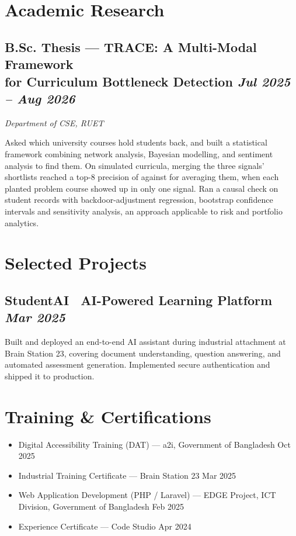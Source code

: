 \documentclass[10pt, a4paper]{article}
\newcommand{\datedsubsection}[2]{%
  \needspace{8\baselineskip}\subsection*{#1 \hfill \small\textit{#2}}%
}
\newcommand{\resitem}[1]{\item #1}
\begin{document}
\section{Academic Research}
\datedsubsection{B.Sc. Thesis --- TRACE: A Multi-Modal Framework \\ for Curriculum Bottleneck Detection}{Jul 2025 -- Aug 2026}
\textit{Department of CSE, RUET}

Asked which university courses hold students back, and built a statistical framework combining network analysis, Bayesian modelling, and sentiment analysis to find them. On simulated curricula, merging the three signals' shortlists reached a top-8 precision of \factLakMerge{} against \factLakAverage{} for averaging them, when each planted problem course showed up in only one signal. Ran a causal check on \factTraceStudents{} student records with backdoor-adjustment regression, bootstrap confidence intervals and sensitivity analysis, an approach applicable to risk and portfolio analytics.

\section{Selected Projects}
\datedsubsection{StudentAI \textbar\ AI-Powered Learning Platform}{Mar 2025}

Built and deployed an end-to-end AI assistant during industrial attachment at Brain Station 23, covering document understanding, question answering, and automated assessment generation. Implemented secure authentication and shipped it to production.

\section{Training \& Certifications}
\begin{itemize}
    \resitem{Digital Accessibility Training (DAT) --- a2i, Government of Bangladesh \href{https://drive.google.com/file/d/1r0YTwNWt2G--afHjJkN7hf9taI2d445W/view?usp=sharing}{\faExternalLink*} \hfill Oct 2025}
    \resitem{Industrial Training Certificate --- Brain Station 23 \href{https://drive.google.com/file/d/1_Smp7BMAuuKgN4McPJv-UFcsK27mXtBj/view?usp=sharing}{\faExternalLink*} \hfill Mar 2025}
    \resitem{Web Application Development (PHP / Laravel) --- EDGE Project, ICT Division, Government of Bangladesh \href{https://training.edge.gov.bd/certificate-validation?certificate_no=EDGE-DSTS-116-6631-00012}{\faExternalLink*} \hfill Feb 2025}
    \resitem{Experience Certificate --- Code Studio \href{https://drive.google.com/file/d/195bms3HX2eF-QGjPypnlaZmQLn2nv7xT/view?usp=sharing}{\faExternalLink*} \hfill Apr 2024}
\end{itemize}
\end{document}
